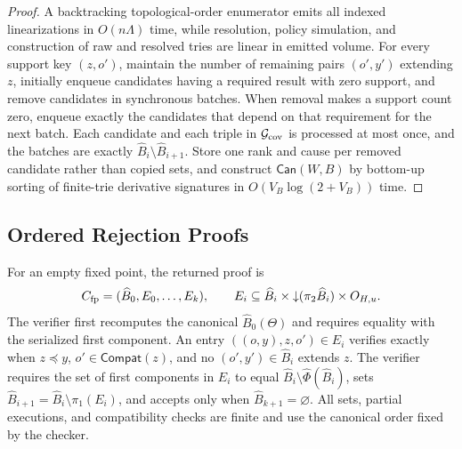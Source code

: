 \begin{proof}
A backtracking topological-order enumerator emits all indexed linearizations in \(O(n\Lambda)\) time, while resolution, policy simulation, and construction of raw and resolved tries are linear in emitted volume.
For every support key \((z,o')\), maintain the number of remaining pairs \((o',y')\) extending \(z\), initially enqueue candidates having a required result with zero support, and remove candidates in synchronous batches.
When removal makes a support count zero, enqueue exactly the candidates that depend on that requirement for the next batch.
Each candidate and each triple in \(\mathcal G_{\rm cov}\) is processed at most once, and the batches are exactly \(\widehat B_i\setminus\widehat B_{i+1}\).
Store one rank and cause per removed candidate rather than copied sets, and construct \(\mathsf{Can}(W,B)\) by bottom-up sorting of finite-trie derivative signatures in \(O(V_B\log(2+V_B))\) time.
\end{proof}

\subsection{Ordered Rejection Proofs}
\label{app:rejection-proof}

For an empty fixed point, the returned proof is
\[
C_{\rm fp}=(\widehat B_0,E_0,\ldots,E_k),
\qquad
E_i\subseteq
\widehat B_i\times\mathord{\downarrow}(\pi_2\widehat B_i)
\times O_{H,u}.
\]
The verifier first recomputes the canonical \(\widehat B_0(\Theta)\) and requires equality with the serialized first component.
An entry \(((o,y),z,o')\in E_i\) verifies exactly when \(z\preceq y\), \(o'\in\mathsf{Compat}(z)\), and no \((o',y')\in\widehat B_i\) extends \(z\).
The verifier requires the set of first components in \(E_i\) to equal \(\widehat B_i\setminus\widehat\Phi(\widehat B_i)\), sets \(\widehat B_{i+1}=\widehat B_i\setminus\pi_1(E_i)\), and accepts only when \(\widehat B_{k+1}=\varnothing\).
All sets, partial executions, and compatibility checks are finite and use the canonical order fixed by the checker.

